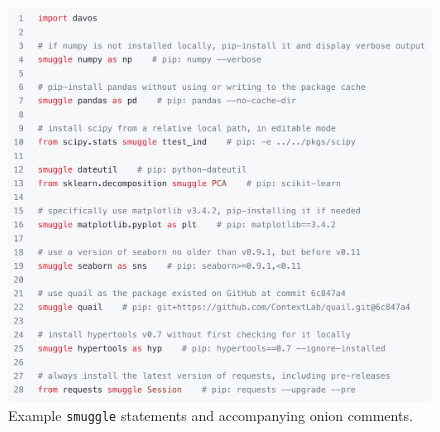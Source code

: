 \documentclass[preprint,12pt,a4paper]{elsarticle}
\begin{document}
\begin{figure}[h]
\centering
\includegraphics[width=\textwidth]{figs/snippets.pdf}
\caption{\small Example \texttt{smuggle} statements and accompanying onion comments.}
\label{fig:snippets}
\end{figure}
\end{document}
